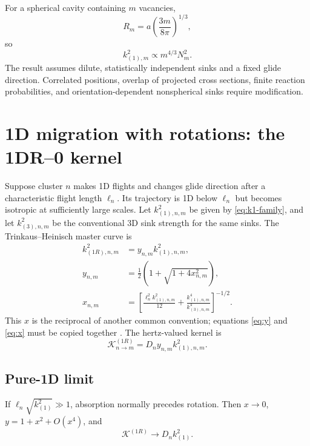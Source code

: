 \documentclass[11pt]{article}
\newcommand{\KK}{\mathcal{K}}
\begin{document}
For a spherical cavity containing \(m\) vacancies,
\begin{equation}
 R_m=a\left(\frac{3m}{8\pi}\right)^{1/3},
\end{equation}
so
\begin{equation}
 k^2_{(1),m}\propto m^{4/3}N_m^2.
\end{equation}
The result assumes dilute, statistically independent sinks and a fixed glide
direction. Correlated positions, overlap of projected cross sections, finite
reaction probabilities, and orientation-dependent nonspherical sinks require
modification.

\section{1D migration with rotations: the 1DR--0 kernel}
Suppose cluster \(n\) makes 1D flights and changes glide direction after a
characteristic flight length \(\ell_n\). Its trajectory is 1D below
\(\ell_n\) but becomes isotropic at sufficiently large scales. Let
\(k^2_{(1),n,m}\) be given by \cref{eq:k1-family}, and let
\(k^2_{(3),n,m}\) be the conventional 3D sink strength for the same sinks.
The Trinkaus--Heinisch master curve is
\begin{align}
 k^2_{(1R),n,m}&=y_{n,m}k^2_{(1),n,m},             \label{eq:k1r}\\
 y_{n,m}&=\frac12\left(1+\sqrt{1+4x_{n,m}^2}\right),\label{eq:y}\\
 x_{n,m}&=\left[
 \frac{\ell_n^2k^2_{(1),n,m}}{12}
 +\frac{k^4_{(1),n,m}}{k^4_{(3),n,m}}
 \right]^{-1/2}.                                  \label{eq:x}
\end{align}
This \(x\) is the reciprocal of another common convention; equations
\eqref{eq:y} and \eqref{eq:x} must be copied together
\cite{TrinkausHeinisch2002,Barashev2001}. The hertz-valued kernel is
\begin{equation}
 \boxed{\KK^{(1R)}_{n\rightarrow m}
 =D_ny_{n,m}k^2_{(1),n,m}.}                        \label{eq:K1R}
\end{equation}

\subsection{Pure-1D limit}
If \(\ell_n\sqrt{k^2_{(1)}}\gg1\), absorption normally precedes rotation.
Then \(x\to0\), \(y=1+x^2+O(x^4)\), and
\begin{equation}
 \boxed{\KK^{(1R)}\longrightarrow D_nk^2_{(1)}}.
\end{equation}
\end{document}
